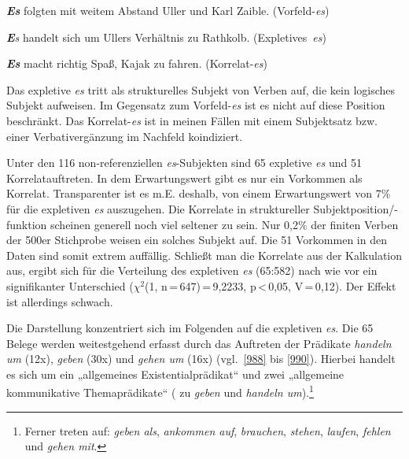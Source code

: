 {\begin{exe}
	\ex\label{985} 
	\textbf{\textit{Es}} folgten mit weitem Abstand Uller und Karl Zaible.
	\hfill\hbox{(Vorfeld-\textit{es})}
\end{exe}

\begin{exe}
	\ex\label{986} 
	\textit{\textbf{E}s} handelt sich um Ullers Verhältnis zu Rathkolb.
	\hfill\hbox{(Expletives \textit{es})}
\end{exe} 	

\begin{exe}
	\ex\label{987} 
	\textbf{\textit{Es}} macht richtig Spaß, Kajak zu fahren.
	\hfill\hbox{(Korrelat-\textit{es})}
	\newline
	\hbox{}\hfill\hbox{\citet[324/325/326]{Speyer2009}}
\end{exe} 
Das expletive \textit{es} tritt als strukturelles Subjekt von Verben auf, die kein logisches Subjekt aufweisen. Im Gegensatz zum Vorfeld-\textit{es} ist es nicht auf diese Position beschränkt. Das Korrelat-\textit{es} ist in meinen Fällen mit einem Subjektsatz bzw. einer Verbativergänzung im Nachfeld koindiziert.

Unter den 116 non-referenziellen \textit{es}-Subjekten sind 65 expletive \textit{es} und 51 Korrelatauftreten. In dem Erwartungswert gibt es nur ein Vorkommen als Korrelat. Transparenter ist es m.E. deshalb, von einem Erwartungswert von 7\% für die expletiven \textit{es} auszugehen. Die Korrelate in struktureller Subjektposition/-funktion scheinen generell noch viel seltener zu sein. Nur 0,2\% der finiten Verben der 500er Stichprobe weisen ein solches Subjekt auf. Die 51 Vorkommen in den Daten sind somit extrem auffällig. Schließt man die Korrelate aus der Kalkulation aus, ergibt sich für die Verteilung des expletiven \textit{es} (65:582) nach wie vor ein signifikanter Unterschied ($\chi^{2}$(1, n\,=\,647)\,=\,9,2233, p\,<\,0,05, V\,=\,0,12). Der Effekt ist allerdings schwach.

Die Darstellung konzentriert sich im Folgenden auf die expletiven \textit{es}. Die 65 Belege werden weitestgehend erfasst durch das Auftreten der Prädikate \textit{handeln um} (12x), \textit{geben} (30x) und \textit{gehen um} (16x) (vgl.\ \ref{988} bis \ref{990}). Hierbei handelt es sich um ein „allgemeines Existentialprädikat“ und zwei „allgemeine kommunikative Themaprädikate“ (\citealt[218]{Askedal1990} zu \textit{geben} und \textit{handeln um}).\footnote{Ferner treten auf: \textit{geben als}, \textit{ankommen auf}, \textit{brauchen}, \textit{stehen}, \textit{laufen}, \textit{fehlen} und \textit{gehen mit}.}

}
